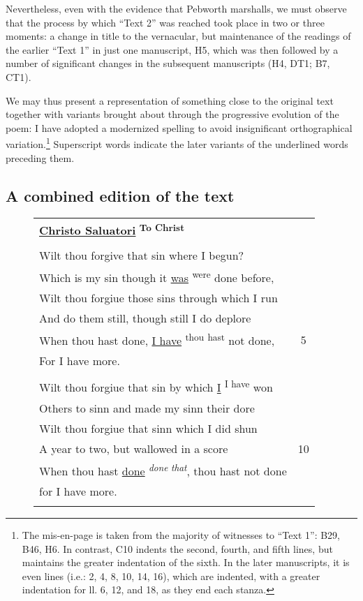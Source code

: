 \begin{paper}
\noindent Nevertheless, even with the evidence that Pebworth marshalls, we must
observe that the process by which ``Text 2'' was reached took place in
two or three moments: a change in title to the vernacular, but
maintenance of the readings of the earlier ``Text 1'' in just one
manuscript, H5, which was then followed by a number of significant
changes in the subsequent manuscripts (H4, DT1; B7, CT1).

We may thus present a representation of something close to the original
text together with variants brought about through the progressive
evolution of the poem: I have adopted a modernized spelling to avoid
insignificant orthographical variation.\footnote{The mis-en-page is
  taken from the majority of witnesses to ``Text 1'': B29, B46, H6. In
  contrast, C10 indents the second, fourth, and fifth lines, but
  maintains the greater indentation of the sixth. In the later
  manuscripts, it is even lines (i.e.: 2, 4, 8, 10, 14, 16), which are
  indented, with a greater indentation for ll. 6, 12, and 18, as they
  end each stanza.} Superscript words indicate the later variants of
the underlined words preceding them.

\vfill
\subsection{A combined edition of the text}

\begin{figure}[H]
    \centering\small
    \begin{tabular}{lc}
    \underline{\textbf{Christo Saluatori}} \textbf{\textsuperscript{To Christ}} \\ \\
    
    Wilt thou forgive that sin where I begun? & \\
    Which is my sin though it \underline{was} \textsuperscript{were} done before, & \\
    Wilt thou forgiue those sins through which I run & \\
    And do them still, though still I do deplore & \\
    When thou hast done, \underline{I have} \textsuperscript{thou} \textsuperscript{hast} not done, & 5 \\
    \-\hspace{2cm}For I have more. & \\ \\
    
    Wilt thou forgiue that sin by which \underline{I} \textsuperscript{I have} won & \\
    Others to sinn and made my sinn their dore & \\
    Wilt thou forgiue that sinn which I did shun & \\
    A year to two, but wallowed in a score &10 \\
    When thou hast \underline{done} \emph{\textsuperscript{done that}}, thou hast not 
    done & \\
    \-\hspace{2cm}for I have more. & \\ \\
    

\end{tabular}
\end{figure}
\end{paper}
